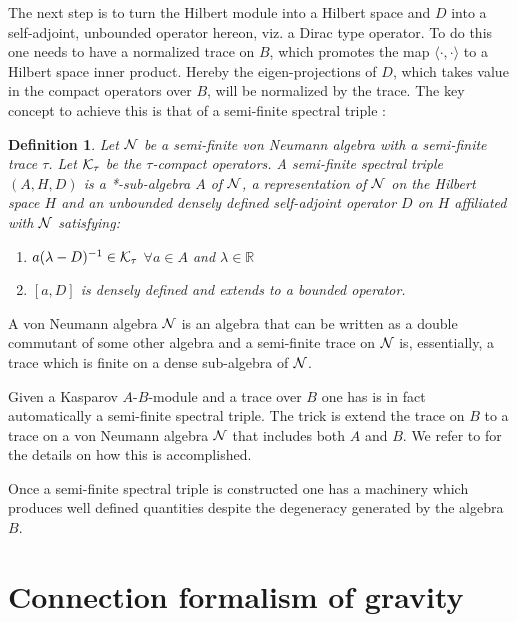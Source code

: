 \documentclass[12pt]{article}
\def\l{\lambda}
\def\t{\tau}
\def\ck{{\cal K}}
\def\cn{{\cal N}}
\newtheorem{definition}[thm]{Definition}
\begin{document}
The next step is to turn the Hilbert module into a Hilbert space and $D$ into a self-adjoint, unbounded operator hereon, viz. a Dirac type operator. To do this one needs to have a normalized trace on $B$, which promotes the map $\langle\cdot,\cdot\rangle$ to a Hilbert space inner product. Hereby the eigen-projections of $D$, which takes value in the compact operators over $B$, will be normalized by the trace.  
The key concept to achieve this is that of a semi-finite spectral triple \cite{Carey}: 
\begin{definition}
Let $\cn$ be a semi-finite von Neumann algebra with a semi-finite trace $\t$. Let $\ck_\t$ be the $\t$-compact operators. A semi-finite spectral triple $(A,H,D)$ is a *-sub-algebra $A$ of $\cn$, a representation of $\cn$ on the Hilbert space $H$ and an unbounded densely defined self-adjoint operator $D$ on $H$ affiliated with $\cn$ satisfying:
\begin{enumerate}
\item
$a(\l-D)^{-1}\in \ck_\t$ $ \forall a\in A$ and $\l\in\mathbb{R}$
\item
$[a,D]$ is densely defined and extends to a bounded operator. 
\end{enumerate}
\end{definition}
A von Neumann algebra $\cn$ is an algebra that can be written as a double commutant of some other algebra and a semi-finite trace on $\cn$ is, essentially, a trace which is finite on a dense sub-algebra of $\cn$.

Given a Kasparov $A$-$B$-module and a trace over $B$ one has is in fact automatically a semi-finite spectral triple. The trick is extend the trace on $B$ to a trace on a von Neumann algebra $\cn$ that includes both $A$ and $B$. We refer to \cite{RenniePask} for the details on how this is accomplished. 


Once a semi-finite spectral triple is constructed one has a machinery which produces well defined quantities despite the degeneracy generated by the algebra $B$. 








\section{Connection formalism of gravity}
\label{confor}
\end{document}
